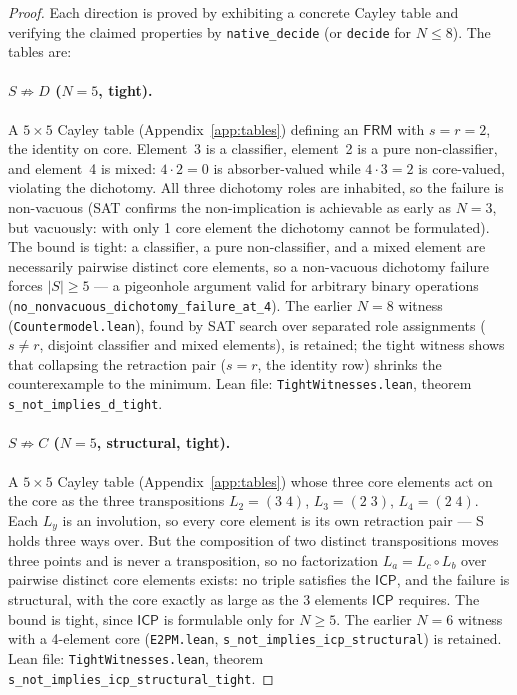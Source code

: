 \documentclass[sigconf,screen]{acmart}
\newcommand{\dotop}{\cdot}
\newcommand{\FRM}{\textsf{FRM}}
\newcommand{\ICP}{\textsf{ICP}}
\theoremstyle{remark}
\begin{document}
\begin{proof}
Each direction is proved by exhibiting a concrete Cayley table and verifying the claimed properties by \texttt{native\_decide} (or \texttt{decide} for $N \leq 8$). The tables are:

\paragraph{$S \not\Rightarrow D$ ($N\!=\!5$, tight).}
A $5 \times 5$ Cayley table (Appendix~\ref{app:tables}) defining an $\FRM$ with $s = r = 2$, the identity on core. Element~3 is a classifier, element~2 is a pure non-classifier, and element~4 is mixed: $4 \dotop 2 = 0$ is absorber-valued while $4 \dotop 3 = 2$ is core-valued, violating the dichotomy. All three dichotomy roles are inhabited, so the failure is non-vacuous (SAT confirms the non-implication is achievable as early as $N\!=\!3$, but vacuously: with only 1 core element the dichotomy cannot be formulated). The bound is tight: a classifier, a pure non-classifier, and a mixed element are necessarily pairwise distinct core elements, so a non-vacuous dichotomy failure forces $|S| \geq 5$ --- a pigeonhole argument valid for arbitrary binary operations (\texttt{no\_nonvacuous\_dichotomy\_failure\_at\_4}). The earlier $N\!=\!8$ witness (\texttt{Countermodel.lean}), found by SAT search over separated role assignments ($s \neq r$, disjoint classifier and mixed elements), is retained; the tight witness shows that collapsing the retraction pair ($s = r$, the identity row) shrinks the counterexample to the minimum. Lean file: \texttt{TightWitnesses.lean}, theorem \texttt{s\_not\_implies\_d\_tight}.

\paragraph{$S \not\Rightarrow C$ ($N\!=\!5$, structural, tight).}
A $5 \times 5$ Cayley table (Appendix~\ref{app:tables}) whose three core elements act on the core as the three transpositions $L_2 = (3\;4)$, $L_3 = (2\;3)$, $L_4 = (2\;4)$. Each $L_y$ is an involution, so every core element is its own retraction pair --- S holds three ways over. But the composition of two distinct transpositions moves three points and is never a transposition, so no factorization $L_a = L_c \circ L_b$ over pairwise distinct core elements exists: no triple satisfies the $\ICP$, and the failure is structural, with the core exactly as large as the 3 elements $\ICP$ requires. The bound is tight, since $\ICP$ is formulable only for $N \geq 5$. The earlier $N\!=\!6$ witness with a 4-element core (\texttt{E2PM.lean}, \texttt{s\_not\_\allowbreak implies\_\allowbreak icp\_\allowbreak structural}) is retained. Lean file: \texttt{TightWitnesses.lean}, theorem \texttt{s\_not\_implies\_icp\_structural\_tight}.


\end{proof}
\end{document}
